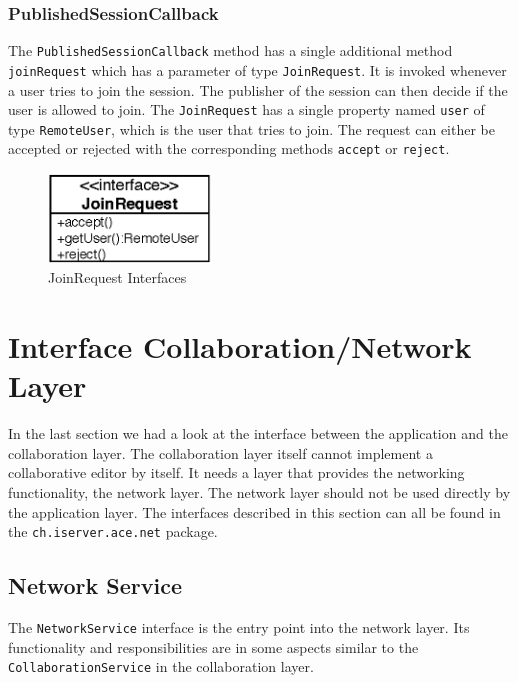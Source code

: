 \subsubsection{PublishedSessionCallback}
The \texttt{Published\-Session\-Callback} method has a single additional method
\texttt{join\-Request} which has a parameter of type \texttt{Join\-Request}. It
is invoked whenever a user tries to join the session. The publisher of the
session can then decide if the user is allowed to join. 
The \texttt{Join\-Request}
has a single property named \texttt{user} of type \texttt{Remote\-User}, 
which is the user that 
tries to join. The request can either be accepted or rejected with the 
corresponding methods \texttt{accept} or \texttt{reject}.

\begin{figure}[H]
 \centering
 \includegraphics[width=4.34cm,height=2.40cm]{../images/finalreport/architecture_joinrequest_uml.eps}
 \caption{JoinRequest Interfaces}
\end{figure}



\section{Interface Collaboration/Network Layer}
In the last section we had a look at the interface between the application and
the collaboration layer. The collaboration layer itself cannot implement a
collaborative editor by itself. It needs a layer that provides the networking
functionality, the network layer. The network layer should not be used
directly by the application layer. The interfaces described in this 
section can all be found in the \texttt{ch.\-iserver.\-ace.\-net} package.


\subsection{Network Service}
The \texttt{Network\-Service} interface is the entry point into the network 
layer. Its functionality and responsibilities are in some aspects similar to the 
\texttt{Collaboration\-Service} in the collaboration layer. 

